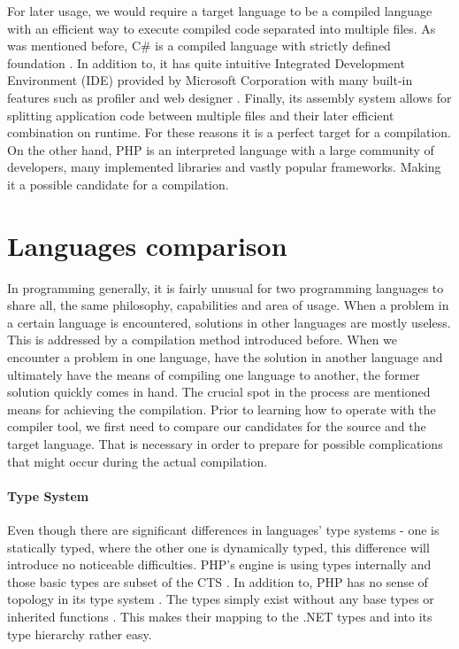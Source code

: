 For later usage, we would require a target language to be a compiled language with an efficient way to execute compiled code separated into multiple files. As was mentioned before, C\# is a compiled language with strictly defined foundation \citep{microsoft.docs}. In addition to, it has quite intuitive Integrated Development Environment (IDE) provided by Microsoft Corporation with many built-in features such as profiler and web designer \citep{microsoft.docs}. Finally, its assembly system allows for splitting application code between multiple files and their later efficient combination on runtime. For these reasons it is a perfect target for a compilation. On the other hand, PHP is an interpreted language with a large community of developers, many implemented libraries and vastly popular frameworks. Making it a possible candidate for a compilation.




\section{Languages comparison}
In programming generally, it is fairly unusual for two programming languages to share all, the same philosophy, capabilities and area of usage. When a problem in a certain language is encountered, solutions in other languages are mostly useless. This is addressed by a compilation method introduced before. When we encounter a problem in one language, have the solution in another language and ultimately have the means of compiling one language to another, the former solution quickly comes in hand. The crucial spot in the process are mentioned means for achieving the compilation. Prior to learning how to operate with the compiler tool, we first need to compare our candidates for the source and the target language. That is necessary in order to prepare for possible complications that might occur during the actual compilation.


\paragraph{Type System}
Even though there are significant differences in languages' type systems - one is statically typed, where the other one is dynamically typed, this difference will introduce no noticeable difficulties. PHP's engine is using types internally and those basic types are subset of the CTS \citep{php.internals, Ecma335}. In addition to, PHP has no sense of topology in its type system \citep{php.manual}. The types simply exist without any base types or inherited functions \citep{php.manual}. This makes their mapping to the .NET types and into its type hierarchy rather easy.

